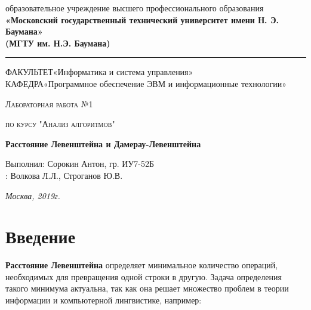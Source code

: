 ﻿\documentclass[12pt]{report}
\newcommand{\hsp}{\hspace{20pt}} %
\begin{document}
    \begin{titlepage}

        \begin{center}
            \large
            { образовательное учреждение высшего профессионального образования\\
            {\bf«Московский государственный технический университет имени Н. Э. Баумана»\\
				(МГТУ им. Н.Э. Баумана)}}
				\noindent\rule{\textwidth}{2pt}
		\end{center}
				{\large ФАКУЛЬТЕТ\hsp«Информатика и система управления»}\\
				{\large КАФЕДРА\hsp«Программное обеспечение ЭВМ и информационные технологии»}\\
		\begin{center}
            \vspace{3cm}

				{\scshape\large Лабораторная работа №1 \par}
				\vspace{0.5cm}	
				{\scshape\large по курсу "Анализ алгоритмов" \par}
				\vspace{1.5cm}
				{\huge\bfseries Расстояние Левенштейна и Дамерау-Левенштейна \par}
				\vspace{2cm}
				\large Выполнил: Сорокин Антон, гр. ИУ7-52Б\\
				\vspace{0.5cm}
				{: Волкова Л.Л., Строганов Ю.В.}
			
				\vfill
				\large \textit {Москва, 2019г.}
            
            \end{center}

    \end{titlepage}
	
	\tableofcontents

	\chapter*{Введение}

	{\bf Расстояние Левенштейна} определяет минимальное количество операций, необходимых для превращения одной строки в другую. Задача определения такого минимума актуальна, так как она решает множество проблем в теории информации и компьютерной лингвистике, например:
\end{document}

